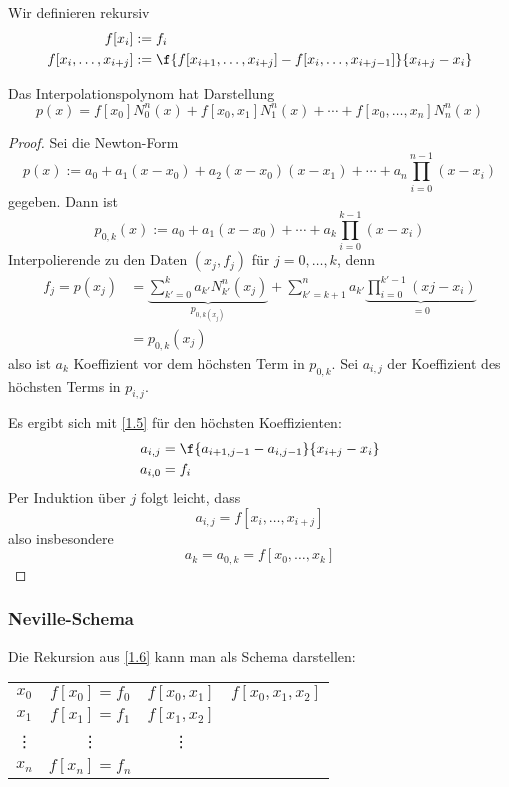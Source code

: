 \documentclass[a4paper,11pt]{scrartcl}
\begin{document}
\begin{df}
	\label{1.6}
	Wir definieren rekursiv
	\begin{align*}
		f[x_i] &:= f_i\\
		f[x_i,\dotsc,x_{i+j}] &:= \f {f[x_{i+1},\dotsc,x_{i+j}] - f[x_i,\dotsc,x_{i+j-1}]}{x_{i+j}-x_i}
	\end{align*}
\end{df}

\begin{st}
	\label{1.7}
	Das Interpolationspolynom hat Darstellung
	\[
		p(x) = f[x_0]N_0^n(x) + f[x_0,x_1]N_1^n(x) + \dotsb + f[x_0,\dotsc,x_n]N_n^n(x)
	\]
	\begin{proof}
		Sei die Newton-Form
		\[
			p(x) := a_0 + a_1(x-x_0) + a_2(x-x_0)(x-x_1) + \dotsb + a_n\prod_{i=0}^{n-1}(x-x_i)
		\]
		gegeben.
		Dann ist
		\[
			p_{0,k}(x) := a_0 + a_1(x-x_0) + \dotsb + a_k\prod_{i=0}^{k-1}(x-x_i)
		\]
		Interpolierende zu den Daten $(x_j,f_j)$ für $j=0,\dotsc,k$, denn
		\begin{align*}
			f_j = p(x_j) &= \underbrace{\sum_{k'=0}^ka_{k'}N_{k'}^n(x_j)}_{p_{0,k(x_j)}} + \sum_{k'=k+1}^n a_{k'}\underbrace{\prod_{i=0}^{k'-1}(xj-x_i)}_{=0}\\
			&= p_{0,k}(x_j)
		\end{align*}
		also ist $a_k$ Koeffizient vor dem höchsten Term in $p_{0,k}$.
		Sei $a_{i,j}$ der Koeffizient des höchsten Terms in $p_{i,j}$.

		Es ergibt sich mit \ref{1.5} für den höchsten Koeffizienten:
		\begin{align*}
			a_{i,j} &= \f {a_{i+1,j-1} - a_{i,j-1}}{x_{i+j}-x_i}\\
			a_{i,0} &= f_i
		\end{align*}
		Per Induktion über $j$ folgt leicht, dass
		\[
			a_{i,j} = f[x_i,\dotsc, x_{i+j}]
		\]
		also insbesondere
		\[
			a_k = a_{0,k} = f[x_0,\dotsc, x_k]
		\]
	\end{proof}
\end{st}

\subsubsection{Neville-Schema}

Die Rekursion aus \ref{1.6} kann man als Schema darstellen:

\begin{tabular}{cccc}
$x_0$ & $f[x_0]=f_0$ & $f[x_0,x_1]$ & $f[x_0,x_1,x_2]$ \\
$x_1$ & $f[x_1]=f_1$ & $f[x_1,x_2]$ &  \\
\vdots & \vdots & \vdots\\
$x_n$ & $f[x_n]=f_n$ &\\
\end{tabular}
\end{document}
